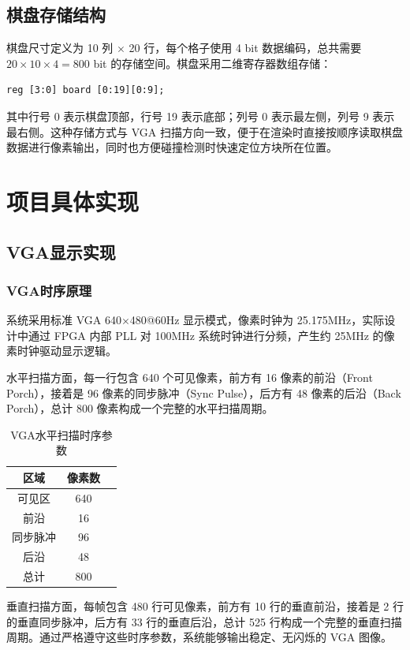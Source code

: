 \documentclass[UTF8,zihao=-4]{ctexart}
\begin{document}
\subsection{棋盘存储结构}
棋盘尺寸定义为 10 列 $\times$ 20 行，每个格子使用 4 bit 数据编码，总共需要 $20\times10\times4=800$ bit 的存储空间。棋盘采用二维寄存器数组存储：

\begin{lstlisting}
reg [3:0] board [0:19][0:9];
\end{lstlisting}

其中行号 0 表示棋盘顶部，行号 19 表示底部；列号 0 表示最左侧，列号 9 表示最右侧。这种存储方式与 VGA 扫描方向一致，便于在渲染时直接按顺序读取棋盘数据进行像素输出，同时也方便碰撞检测时快速定位方块所在位置。

\section{项目具体实现}

\subsection{VGA显示实现}
\subsubsection{VGA时序原理}
系统采用标准 VGA 640$\times$480@60Hz 显示模式，像素时钟为 25.175MHz，实际设计中通过 FPGA 内部 PLL 对 100MHz 系统时钟进行分频，产生约 25MHz 的像素时钟驱动显示逻辑。

水平扫描方面，每一行包含 640 个可见像素，前方有 16 像素的前沿（Front Porch），接着是 96 像素的同步脉冲（Sync Pulse），后方有 48 像素的后沿（Back Porch），总计 800 像素构成一个完整的水平扫描周期。

\begin{table}[H]
\centering
\caption{VGA水平扫描时序参数}
\begin{tabular}{ccc}
\toprule
区域 & 像素数 \\
\midrule
可见区 & 640 \\
前沿 & 16 \\
同步脉冲 & 96 \\
后沿 & 48 \\
总计 & 800 \\
\bottomrule
\end{tabular}
\end{table}

垂直扫描方面，每帧包含 480 行可见像素，前方有 10 行的垂直前沿，接着是 2 行的垂直同步脉冲，后方有 33 行的垂直后沿，总计 525 行构成一个完整的垂直扫描周期。通过严格遵守这些时序参数，系统能够输出稳定、无闪烁的 VGA 图像。
\end{document}
